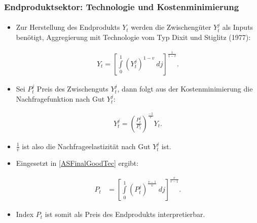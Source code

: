 \documentclass[10pt]{beamer}  %
\begin{document}
\begin{frame}\label{OptimEPS}
\frametitle{Endproduktsektor: Technologie und Kostenminimierung}\framesubtitle{}
\begin{itemize}
  \item Zur Herstellung des Endprodukts $Y_t$ werden die Zwischeng\"{u}ter $Y_t^j$ als Inputs ben\"{o}tigt, Aggregierung mit Technologie vom Typ Dixit und Stiglitz (1977):
\begin{scriptsize}\begin{align}\label{ASFinalGoodTec}
    Y_t = \left[\int\limits_0^1 (Y_t^j)^{1-v} ~ dj \right]^\frac{1}{1-v}.
\end{align}
\end{scriptsize}
\item Sei $P_t^j$ Preis des Zwischenguts $Y_t^j$, dann folgt aus der Kostenminimierung die Nachfragefunktion nach Gut $Y_t^j$:\hyperlink{app:OptimEPS}{}
\begin{scriptsize}\begin{align} \label{ASNachfrageytj}
Y_t^j = \left(\frac{P_t^j}{P_t}\right)^\frac{-1}{v}Y_t.
\end{align}
\end{scriptsize}
\item $\frac{1}{v}$ ist also die Nachfrageelastizit\"{a}t nach Gut $Y_t^j$ ist.
\item Eingesetzt in \eqref{ASFinalGoodTec} ergibt:
\begin{scriptsize}\begin{align}
    P_t &= \left[\int\limits_0^1(P_t^j)^\frac{v-1}{v} ~ dj \right]^\frac{v}{v-1}. \label{ASPreisEndprodukt}
\end{align}
\end{scriptsize}
\item Index $P_t$ ist somit als Preis des Endprodukts interpretierbar.
\end{itemize}
\end{frame}
\end{document}
